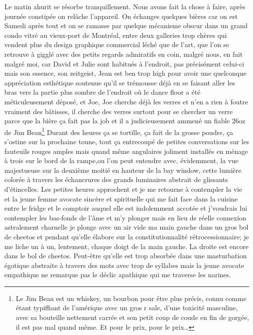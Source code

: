 %
Le matin ahurit se résorbe tranquillement. Nous avons fait la chose à faire,
après journée constipée on relâche l'appareil. On échanges quelques bières car
on est Samedi après tout et on se ramasse par quelque mécanisme obscur dans un
grand condo vitré au vieux-port de Montréal, entre deux galleries trop chères
qui vendent plus du design graphique commercial léché que de l'art, que l'on
se retrouve à gigglé avec des petits regards admiratifs en coin, malgré nous, en
fait malgré moi, car David et Julie sont habitués à l'endroit, pas précisément
celui-ci mais son essence, son zeitgeist, Jean est ben trop high pour avoir 
une quelconque appréciation esthétique soutenue qu'il se trémousse déjà en 
se faisant aller les bras vers la partie plus sombre de l'endroit où le dance
floor a été méticuleusement déposé, et Joe, Joe cherche déjà les verres et n'en 
a rien à foutre vraiment des bâtisses, il cherche des verres surtout pour se
chercher un verre parce que la bière ça fait pas la job et il a judicieusement
ammené un fiable 26oz de Jim Bean\footnote{Le Jim Bean est un whiskey, un
bourbon pour être plus précis, connu comme étant typiffiant de
l'amérique avec un gros r sale, d'une toxicité masculine, avec sa bouteille
nettement carrée et son petit coup de coude en fin de gorgée, il est pas mal
quand même. Et pour le prix, pour le prix\ldots} Durant des heures ça se
tortille, ça fait de la grosse poudre, ça s'ostine sur la prochaine toune, tout
ça entrecoupé de petites conversations sur les fauteuils rouges amples mais
quand même angulaires joliment installés en ménage à trois sur le bord de la
rampe,ou l'on peut entendre  avec, évidemment, la vue majestueuse sur la deuxième
moitié en hauteur de la bay window, cette lumière colorée à travers les
échancrures des grands luminaires abstrait de glissants d'étincelles. Les
petites heures approchent et je me retourne à contempler la vie et la jeune
femme avocate sincère et spirituelle qui me fait face dans la cuisine entre le
fridge et le comptoir auquel elle est indolemment accotée et j'voudrais lui
contempler les bas-fonds de l'âme et m'y plonger mais en lieu de réelle
connexion astralement charnelle je plonge avec un air vide ma main gauche dans
un gros bol de cheetos et pendant qu'elle élabore sur la constitutionnalité
rétrocessionnaire; je me liche un à un, lentement, chaque doigt de la main gauche.
La droite est encore dans le bol de cheetos.
Peut-être qu'elle est trop absorbée
dans une masturbation égotique abstraite à travers des mots avec trop de
syllabes mais la jeune avocate empathique ne remarque pas le déclic apathique
qui me traverse les narines.\\

